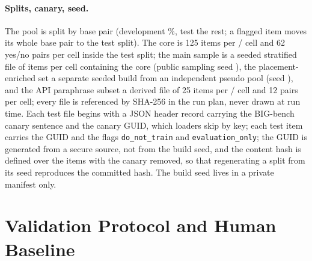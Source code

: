 \paragraph{Splits, canary, seed.}
The pool is split by base pair (development \releaseDevPercent{}\%, test the rest; a flagged item moves its whole base pair to the test split). The core is 125 items per / cell and 62 yes/no pairs per  cell inside the test split; the main sample is a seeded stratified file of \releaseMainPerCell{} items per cell containing the core (public sampling seed \releaseMainSeed{}), the placement-enriched set a separate seeded build from an independent pseudo pool (seed \releaseCtwoSeed{}), and the API paraphrase subset a derived file of 25 items per / cell and 12 pairs per  cell; every file is referenced by SHA-256 in the run plan, never drawn at run time. Each test file begins with a JSON header record carrying the BIG-bench canary sentence and the canary GUID, which loaders skip by key; each test item carries the GUID and the flags \texttt{do\_not\_train} and \texttt{evaluation\_only}; the GUID is generated from a secure source, not from the build seed, and the content hash is defined over the items with the canary removed, so that regenerating a split from its seed reproduces the committed hash. The build seed lives in a private manifest only.

\section{Validation Protocol and Human Baseline}
\label{app:validation}

